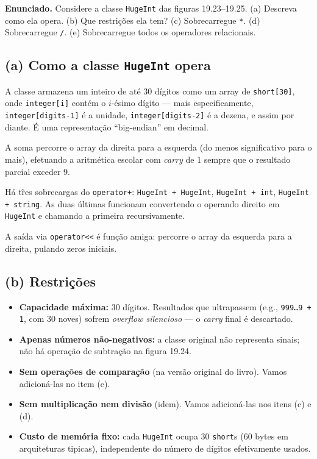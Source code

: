 \documentclass[11pt,a4paper]{article}
\begin{document}
\begin{enunciado}
\textbf{Enunciado.} Considere a classe \texttt{HugeInt} das figuras 19.23--19.25. (a) Descreva como ela opera. (b) Que restri\c{c}\~oes ela tem? (c) Sobrecarregue \texttt{*}. (d) Sobrecarregue \texttt{/}. (e) Sobrecarregue todos os operadores relacionais.
\end{enunciado}

\subsection*{(a) Como a classe \texttt{HugeInt} opera}

A classe armazena um inteiro de at\'e 30 d\'igitos como um array de \texttt{short[30]}, onde \texttt{integer[i]} cont\'em o $i$-\'esimo d\'igito --- mais especificamente, \texttt{integer[digits-1]} \'e a unidade, \texttt{integer[digits-2]} \'e a dezena, e assim por diante. \'E uma representa\c{c}\~ao ``big-endian'' em decimal.

A soma percorre o array da direita para a esquerda (do menos significativo para o mais), efetuando a aritm\'etica escolar com \emph{carry} de 1 sempre que o resultado parcial exceder 9.

H\'a t\^res sobrecargas do \texttt{operator+}: \texttt{HugeInt + HugeInt}, \texttt{HugeInt + int}, \texttt{HugeInt + string}. As duas \'ultimas funcionam convertendo o operando direito em \texttt{HugeInt} e chamando a primeira recursivamente.

A sa\'ida via \texttt{operator<<} \'e fun\c{c}\~ao amiga: percorre o array da esquerda para a direita, pulando zeros iniciais.

\subsection*{(b) Restri\c{c}\~oes}

\begin{itemize}[leftmargin=*]
  \item \textbf{Capacidade m\'axima:} 30 d\'igitos. Resultados que ultrapassem (e.g., \texttt{999\ldots9 + 1}, com 30 noves) sofrem \emph{overflow silencioso} --- o \emph{carry} final \'e descartado.
  \item \textbf{Apenas n\'umeros n\~ao-negativos:} a classe original n\~ao representa sinais; n\~ao h\'a opera\c{c}\~ao de subtra\c{c}\~ao na figura 19.24.
  \item \textbf{Sem opera\c{c}\~oes de compara\c{c}\~ao} (na vers\~ao original do livro). Vamos adicion\'a-las no item (e).
  \item \textbf{Sem multiplica\c{c}\~ao nem divis\~ao} (idem). Vamos adicion\'a-las nos itens (c) e (d).
  \item \textbf{Custo de mem\'oria fixo:} cada \texttt{HugeInt} ocupa 30 \texttt{short}s (60 bytes em arquiteturas tipicas), independente do n\'umero de d\'igitos efetivamente usados.
\end{itemize}
\end{document}
